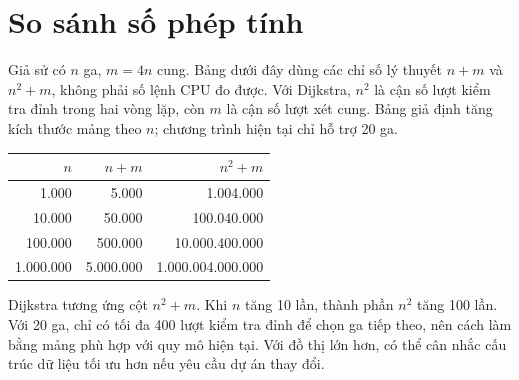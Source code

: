\section{So sánh số phép tính}
Giả sử có $n$ ga, $m=4n$ cung. Bảng dưới đây dùng các chỉ số lý thuyết $n+m$ và $n^2+m$, không phải số lệnh CPU đo được. Với Dijkstra, $n^2$ là cận số lượt kiểm tra đỉnh trong hai vòng lặp, còn $m$ là cận số lượt xét cung. Bảng giả định tăng kích thước mảng theo $n$; chương trình hiện tại chỉ hỗ trợ 20 ga.
\begin{center}
\begin{tabular}{r|r|r}
$n$ & $n+m$ & $n^2+m$ \\\hline
1.000 & 5.000 & 1.004.000 \\
10.000 & 50.000 & 100.040.000 \\
100.000 & 500.000 & 10.000.400.000 \\
1.000.000 & 5.000.000 & 1.000.004.000.000 \\
\end{tabular}
\end{center}
Dijkstra tương ứng cột $n^2+m$. Khi $n$ tăng 10 lần, thành phần $n^2$ tăng 100 lần. Với 20 ga, chỉ có tối đa 400 lượt kiểm tra đỉnh để chọn ga tiếp theo, nên cách làm bằng mảng phù hợp với quy mô hiện tại. Với đồ thị lớn hơn, có thể cân nhắc cấu trúc dữ liệu tối ưu hơn nếu yêu cầu dự án thay đổi.
